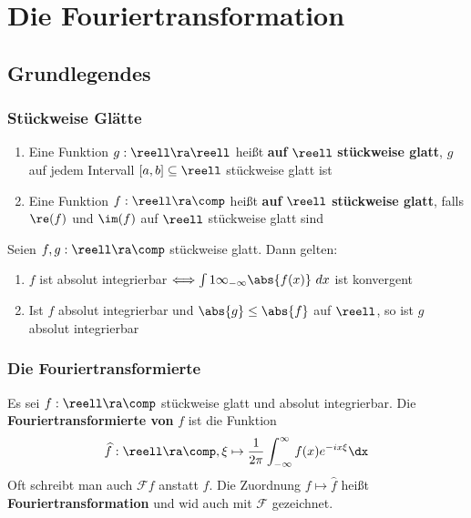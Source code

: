 \documentclass{kit}
\begin{document}
\section{Die Fouriertransformation}
  \subsection{Grundlegendes}
    \subsubsection{Stückweise Glätte}
      \begin{enumerate}
        \item Eine Funktion $g:\reell\ra\reell$ heißt \textbf{auf} $\reell$ \textbf{stückweise glatt}, $g$ auf jedem
          Intervall $[a,b]\subseteq\reell$ stückweise glatt ist
        \item Eine Funktion $f:\reell\ra\comp$ heißt \textbf{auf} $\reell$ \textbf{stückweise glatt}, falls $\re(f)$ und 
          $\im(f)$ auf $\reell$ stückweise glatt sind
      \end{enumerate}
      Seien $f,g:\reell\ra\comp$ stückweise glatt. Dann gelten:
      \begin{enumerate}
        \item $f$ ist absolut integrierbar $\Longleftrightarrow\int1\infty_{-\infty}\abs{f(x)}\ dx$ ist konvergent
        \item Ist $f$ absolut integrierbar und $\abs{g}\le\abs{f}$ auf $\reell$, so ist $g$ absolut integrierbar
      \end{enumerate}
    \subsubsection{Die Fouriertransformierte}
      Es sei $f:\reell\ra\comp$ stückweise glatt und absolut integrierbar. Die \textbf{Fouriertransformierte von} $f$ ist
      die Funktion
      $$\widehat f:\reell\ra\comp,\xi\mapsto\frac{1}{2\pi}\int^\infty_{-\infty}f(x)e^{-ix\xi}\dx$$
      Oft schreibt man auch $\mathcal{F}f$ anstatt $\widehat f$. Die Zuordnung $f\mapsto\widehat f$ heißt 
      \textbf{Fouriertransformation} und wid auch mit $\mathcal{F}$ gezeichnet.
\end{document}
